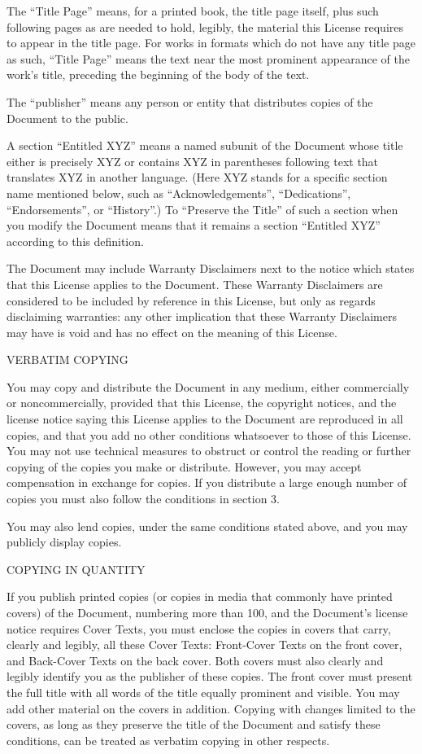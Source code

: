 The ``Title Page'' means, for a printed book, the title page itself, plus such following pages as are needed to hold, legibly, the material this License requires to appear in the title page.  For works in formats which do not have any title page as such, ``Title Page'' means the text near the most prominent appearance of the work's title, preceding the beginning of the body of the text.

The ``publisher'' means any person or entity that distributes copies of the Document to the public.

A section ``Entitled XYZ'' means a named subunit of the Document whose title either is precisely XYZ or contains XYZ in parentheses following text that translates XYZ in another language.  (Here XYZ stands for a specific section name mentioned below, such as ``Acknowledgements'', ``Dedications'', ``Endorsements'', or ``History''.)  To ``Preserve the Title'' of such a section when you modify the Document means that it remains a section ``Entitled XYZ'' according to this definition.

The Document may include Warranty Disclaimers next to the notice which states that this License applies to the Document.  These Warranty Disclaimers are considered to be included by reference in this License, but only as regards disclaiming warranties: any other implication that these Warranty Disclaimers may have is void and has no effect on the meaning of this License.

\item
VERBATIM COPYING

You may copy and distribute the Document in any medium, either commercially or noncommercially, provided that this License, the copyright notices, and the license notice saying this License applies to the Document are reproduced in all copies, and that you add no other conditions whatsoever to those of this License.  You may not use technical measures to obstruct or control the reading or further copying of the copies you make or distribute.  However, you may accept compensation in exchange for copies.  If you distribute a large enough number of copies you must also follow the conditions in section 3.

You may also lend copies, under the same conditions stated above, and you may publicly display copies.

\item
COPYING IN QUANTITY

If you publish printed copies (or copies in media that commonly have printed covers) of the Document, numbering more than 100, and the Document's license notice requires Cover Texts, you must enclose the copies in covers that carry, clearly and legibly, all these Cover Texts: Front-Cover Texts on the front cover, and Back-Cover Texts on the back cover.  Both covers must also clearly and legibly identify you as the publisher of these copies.  The front cover must present the full title with all words of the title equally prominent and visible.  You may add other material on the covers in addition. Copying with changes limited to the covers, as long as they preserve the title of the Document and satisfy these conditions, can be treated as verbatim copying in other respects.

